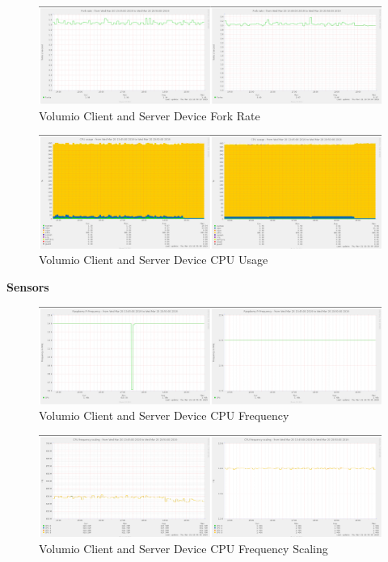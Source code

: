 \documentclass[11pt,a4paper]{scrreprt}
\begin{document}
\begin{figure}[H]
\includegraphics{ResultsAndAnalysis/VolumioServerTestImages/013VolumioForkRate.png}
\centering
\caption{Volumio Client and Server Device Fork Rate}
\label{VolumioForkRate}
\end{figure}

\begin{figure}[H]
\includegraphics{ResultsAndAnalysis/VolumioServerTestImages/004VolumioCPUUsage.png}
\centering
\caption{Volumio Client and Server Device CPU Usage}
\label{VolumioCPUUsage}
\end{figure}

\textbf{Sensors}

\begin{figure}[H]
\includegraphics{ResultsAndAnalysis/VolumioServerTestImages/001VolumioCPUFreq.png}
\centering
\caption{Volumio Client and Server Device CPU Frequency}
\label{VolumioCPUFreq}
\end{figure}

\begin{figure}[H]
\includegraphics{ResultsAndAnalysis/VolumioServerTestImages/002VolumioCPUFreqScaling.png}
\centering
\caption{Volumio Client and Server Device CPU Frequency Scaling}
\label{VolumioCPUFreqScaling}
\end{figure}
\end{document}
